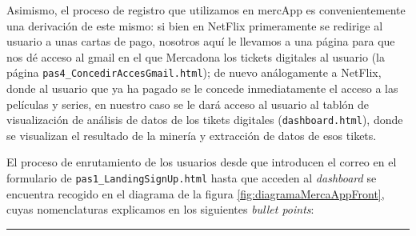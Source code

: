 \documentclass[a4paper,12pt]{report}
\begin{document}
	Asimismo, el proceso de registro que utilizamos en mercApp es convenientemente una derivación de este mismo: si bien en NetFlix primeramente se redirige al usuario a unas cartas de pago, nosotros aquí le llevamos a una página para que nos dé acceso al gmail en el que Mercadona los tickets digitales al usuario (la página  \texttt{pas4\_ConcedirAccesGmail.html}); de nuevo análogamente a NetFlix, donde al usuario que ya ha pagado se le concede inmediatamente el acceso a las películas y series,  en nuestro caso se le dará acceso al usuario al tablón de visualización de análisis de datos de los tikets digitales  (\texttt{dashboard.html}), donde se visualizan el resultado de la minería y extracción de datos de esos tikets. 
	
	El proceso de enrutamiento de los usuarios desde que introducen el correo en el formulario de \texttt{pas1\_LandingSignUp.html} hasta que acceden al \textit{dashboard} se encuentra recogido en el diagrama de la figura \ref{fig:diagramaMercaAppFront}, cuyas nomenclaturas explicamos en los siguientes \textit{bullet points}:
	\vspace{1em}
	\hrule
	
\end{document}

